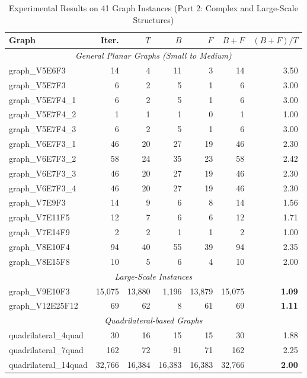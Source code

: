 \documentclass[12pt,a4paper]{article}
\theoremstyle{definition}
\theoremstyle{remark}
\begin{document}
\begin{table}[p]
\centering
\small
\caption{Experimental Results on 41 Graph Instances (Part 2: Complex and Large-Scale Structures)}
\label{tab:experimental_results_part2}
\begin{tabular}{|l|r|r|r|r|r|r|}
\hline
\textbf{Graph} & \textbf{Iter.} & \textbf{$T$} & \textbf{$B$} & \textbf{$F$} & \textbf{$B+F$} & \textbf{$(B+F)/T$} \\
\hline
\multicolumn{7}{|c|}{\textit{General Planar Graphs (Small to Medium)}} \\
\hline
graph\_V5E6F3 & 14 & 4 & 11 & 3 & 14 & 3.50 \\
graph\_V5E7F3 & 6 & 2 & 5 & 1 & 6 & 3.00 \\
graph\_V5E7F4\_1 & 6 & 2 & 5 & 1 & 6 & 3.00 \\
graph\_V5E7F4\_2 & 1 & 1 & 1 & 0 & 1 & 1.00 \\
graph\_V5E7F4\_3 & 6 & 2 & 5 & 1 & 6 & 3.00 \\
graph\_V6E7F3\_1 & 46 & 20 & 27 & 19 & 46 & 2.30 \\
graph\_V6E7F3\_2 & 58 & 24 & 35 & 23 & 58 & 2.42 \\
graph\_V6E7F3\_3 & 46 & 20 & 27 & 19 & 46 & 2.30 \\
graph\_V6E7F3\_4 & 46 & 20 & 27 & 19 & 46 & 2.30 \\
graph\_V7E9F3 & 14 & 9 & 6 & 8 & 14 & 1.56 \\
graph\_V7E11F5 & 12 & 7 & 6 & 6 & 12 & 1.71 \\
graph\_V7E14F9 & 2 & 2 & 1 & 1 & 2 & 1.00 \\
graph\_V8E10F4 & 94 & 40 & 55 & 39 & 94 & 2.35 \\
graph\_V8E15F8 & 10 & 5 & 6 & 4 & 10 & 2.00 \\
\hline
\multicolumn{7}{|c|}{\textit{Large-Scale Instances}} \\
\hline
graph\_V9E10F3 & 15,075 & 13,880 & 1,196 & 13,879 & 15,075 & \textbf{1.09} \\
graph\_V12E25F12 & 69 & 62 & 8 & 61 & 69 & \textbf{1.11} \\
\hline
\multicolumn{7}{|c|}{\textit{Quadrilateral-based Graphs}} \\
\hline
quadrilateral\_4quad & 30 & 16 & 15 & 15 & 30 & 1.88 \\
quadrilateral\_7quad & 162 & 72 & 91 & 71 & 162 & 2.25 \\
quadrilateral\_14quad & 32,766 & 16,384 & 16,383 & 16,383 & 32,766 & \textbf{2.00} \\
\hline
\end{tabular}
\end{table}
\end{document}
